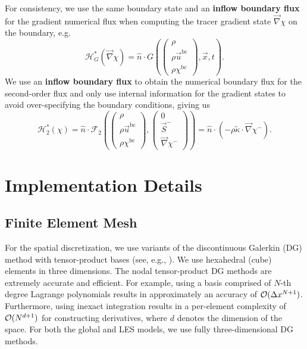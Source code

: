 \documentclass{report}
\numberwithin{equation}{section}
\begin{document}
For consistency, we use the same boundary state and an \textbf{inflow boundary flux} for the gradient numerical flux when computing the tracer gradient state $\overrightarrow{\nabla} \chi$ on the boundary, e.g. 
\begin{equation}
    \mathcal{H}_G^*(\overrightarrow{\nabla} \chi) = \hat n \cdot G \left(\begin{pmatrix} \rho \\ \rho \vec u^{\text{bc}} \\ \rho \chi^{\text{bc}} \end{pmatrix}, \overrightarrow{x}, t \right).
\end{equation}
We use an \textbf{inflow boundary flux} to obtain the numerical boundary flux for the second-order flux and only use internal information for the gradient states to avoid over-specifying the boundary conditions, giving us
\begin{equation}
    \mathcal{H}_2^*(\chi) = \hat n \cdot \mathcal{F}_2 \left(
        \begin{pmatrix} \rho \\ \rho \vec u^{\text{bc}} \\ \rho \chi^{\text{bc}} \end{pmatrix},
        \begin{pmatrix} 0 \\ \vec S^- \\ \overrightarrow{\nabla} \chi^- \end{pmatrix}
    \right)
    = \hat n \cdot \left( - \rho \overleftrightarrow{\kappa} \cdot \overrightarrow{\nabla} \chi^- \right) .
\end{equation}

\section{Implementation Details}

\subsection{Finite Element Mesh}
For the spatial discretization, we use variants of the discontinuous Galerkin (DG) method with tensor-product bases (see, e.g., \citealt{giraldo:2008a,abdi:2016}). 
We use hexahedral (cube) elements in three dimensions.  
The nodal tensor-product DG methods are extremely accurate and efficient.  
For example, using a basis comprised of $N$-th degree Lagrange polynomials results in approximately an accuracy of $\mathcal{O}(\Delta x^{N+1})$. 
Furthermore, using inexact integration results in a per-element complexity of $\mathcal{O}(N^{d+1})$ for constructing derivatives, where $d$ denotes the dimension of the space. 
For both the global and LES models, we use fully three-dimensional DG methods.
\end{document}
